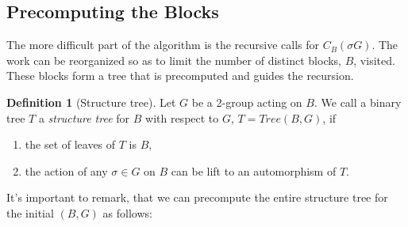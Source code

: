 \documentclass[12pt,a4paper]{book}
\theoremstyle{plain}
\theoremstyle{definition}
\newtheorem{definition}{Definition}
\theoremstyle{remark}
\begin{document}
\subsection{Precomputing the Blocks}

The more difficult part of the algorithm is the recursive calls for $C_B( \sigma G)$. The work can be reorganized so as to limit the number of 
distinct blocks, $B$, visited. These blocks form a tree that is precomputed and guides the recursion.

\begin{definition}[Structure tree]
Let $G$ be a 2-group acting on $B$. We call a binary tree $T$ a \emph{structure tree} for $B$ with respect to $G$, $T=Tree(B,G)$, if

\begin{enumerate}
 \item the set of leaves of $T$ is $B$,
 \item the action of any $\sigma \in G$ on $B$ can be lift to an automorphism of $T$.
\end{enumerate}
\end{definition}

It's important to remark, that we can precompute the entire structure tree for the initial $(B,G)$ as follows:

\begin{algorithm}
 

\end{algorithm}
\end{document}
